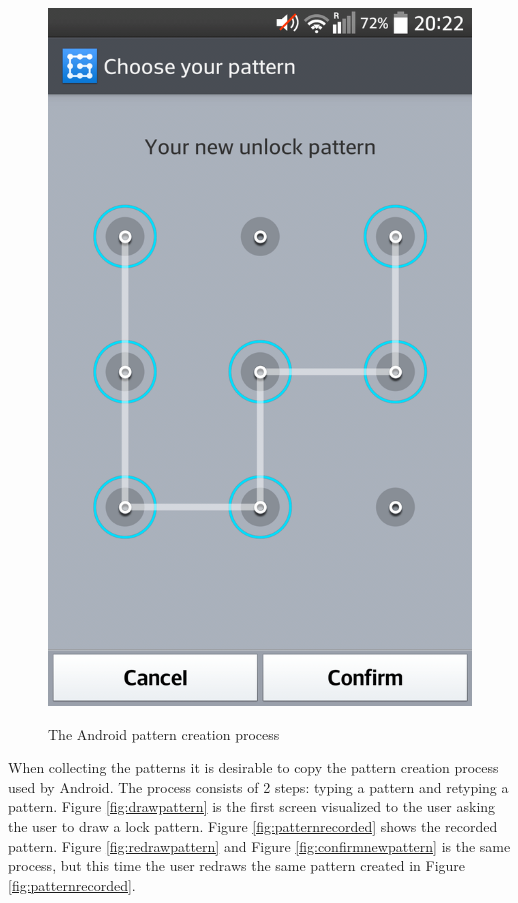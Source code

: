 \begin{figure}[H]
{        \includegraphics[scale=0.09]{pics/experiment/patternprocess1.png}
        \label{fig:confirmnewpattern}
      }
      \caption{The Android pattern creation process}
      \label{fig:androidpatterncreationprocess}
    \end{figure}

    When collecting the patterns it is desirable to copy the pattern creation process used by Android. The process consists of 2 steps: typing a pattern and retyping a pattern. Figure \ref{fig:drawpattern} is the first screen visualized to the user asking the user to draw a lock pattern. Figure \ref{fig:patternrecorded} shows the recorded pattern. Figure \ref{fig:redrawpattern} and Figure \ref{fig:confirmnewpattern} is the same process, but this time the user redraws the same pattern created in Figure \ref{fig:patternrecorded}.

